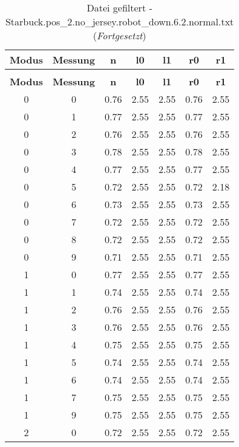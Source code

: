 \clearpage{}
\begin{longtable}{|c|c||c||c|c||c|c|}
	\caption{Datei gefiltert - Starbuck.pos\_2.no\_jersey.robot\_down.6.2.normal.txt} \label{tab:Starbuck.pos-2.no-jersey.robot-down.6.2.normal.txt} \\ \hline
	\textbf{Modus} & \textbf{Messung} & \textbf{n} & \textbf{l0} & \textbf{l1} & \textbf{r0} & \textbf{r1}\\ \hline
	\endfirsthead
	\caption[]{Datei gefiltert - Starbuck.pos\_2.no\_jersey.robot\_down.6.2.normal.txt (\emph{Fortgesetzt})} \\ \hline
	\textbf{Modus} & \textbf{Messung} & \textbf{n} & \textbf{l0} & \textbf{l1} & \textbf{r0} & \textbf{r1}\\ \hline
	\endhead
	0 & 0 & 0.76 & 2.55 & 2.55 & 0.76 & 2.55 \\ \hline
	0 & 1 & 0.77 & 2.55 & 2.55 & 0.77 & 2.55 \\ \hline
	0 & 2 & 0.76 & 2.55 & 2.55 & 0.76 & 2.55 \\ \hline
	0 & 3 & 0.78 & 2.55 & 2.55 & 0.78 & 2.55 \\ \hline
	0 & 4 & 0.77 & 2.55 & 2.55 & 0.77 & 2.55 \\ \hline
	0 & 5 & 0.72 & 2.55 & 2.55 & 0.72 & 2.18 \\ \hline
	0 & 6 & 0.73 & 2.55 & 2.55 & 0.73 & 2.55 \\ \hline
	0 & 7 & 0.72 & 2.55 & 2.55 & 0.72 & 2.55 \\ \hline
	0 & 8 & 0.72 & 2.55 & 2.55 & 0.72 & 2.55 \\ \hline
	0 & 9 & 0.71 & 2.55 & 2.55 & 0.71 & 2.55 \\ \hline
	1 & 0 & 0.77 & 2.55 & 2.55 & 0.77 & 2.55 \\ \hline
	1 & 1 & 0.74 & 2.55 & 2.55 & 0.74 & 2.55 \\ \hline
	1 & 2 & 0.76 & 2.55 & 2.55 & 0.76 & 2.55 \\ \hline
	1 & 3 & 0.76 & 2.55 & 2.55 & 0.76 & 2.55 \\ \hline
	1 & 4 & 0.75 & 2.55 & 2.55 & 0.75 & 2.55 \\ \hline
	1 & 5 & 0.74 & 2.55 & 2.55 & 0.74 & 2.55 \\ \hline
	1 & 6 & 0.74 & 2.55 & 2.55 & 0.74 & 2.55 \\ \hline
	1 & 7 & 0.75 & 2.55 & 2.55 & 0.75 & 2.55 \\ \hline
	1 & 9 & 0.75 & 2.55 & 2.55 & 0.75 & 2.55 \\ \hline
	2 & 0 & 0.72 & 2.55 & 2.55 & 0.72 & 2.55 \\ \hline

\end{longtable}
